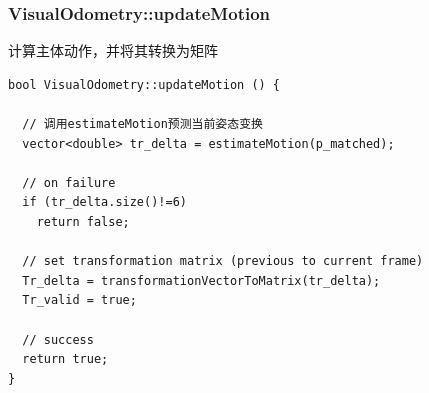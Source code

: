 \documentclass[UTF8]{ctexart}
\begin{document}
    \subsubsection{VisualOdometry::updateMotion}
    计算主体动作，并将其转换为矩阵
    \begin{verbatim}
bool VisualOdometry::updateMotion () {
  
  // 调用estimateMotion预测当前姿态变换
  vector<double> tr_delta = estimateMotion(p_matched);
  
  // on failure
  if (tr_delta.size()!=6)
    return false;
  
  // set transformation matrix (previous to current frame)
  Tr_delta = transformationVectorToMatrix(tr_delta);
  Tr_valid = true;
  
  // success
  return true;
}
    \end{verbatim}
\end{document}
